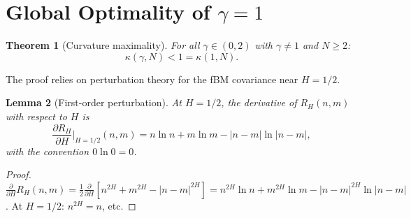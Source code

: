 \documentclass[11pt,a4paper]{article}
\theoremstyle{plain}
\newtheorem{theorem}{Theorem}[section]
\newtheorem{lemma}[theorem]{Lemma}
\theoremstyle{definition}
\theoremstyle{remark}
\begin{document}
\section{Global Optimality of $\gamma = 1$}\label{sec:optimality}

\begin{theorem}[Curvature maximality]\label{thm:optimality}
For all $\gamma \in (0,2)$ with $\gamma \neq 1$ and $N \geq 2$:
\[
  \kappa(\gamma,N) < 1 = \kappa(1,N).
\]
\end{theorem}

The proof relies on perturbation theory for the
fBM covariance near $H = 1/2$.

\begin{lemma}[First-order perturbation]\label{lem:perturbation}
At $H = 1/2$, the derivative of $R_H(n,m)$ with respect to
$H$ is
\begin{equation}\label{eq:dRdH}
  \frac{\partial R_H}{\partial H}\Big|_{H=1/2}(n,m)
  = n\ln n + m\ln m
  - |n-m|\ln|n-m|,
\end{equation}
with the convention $0 \ln 0 = 0$.
\end{lemma}

\begin{proof}
$\frac{\partial}{\partial H}R_H(n,m)
= \frac{1}{2}\frac{\partial}{\partial H}
[n^{2H} + m^{2H} - |n-m|^{2H}]
= n^{2H}\ln n + m^{2H}\ln m - |n-m|^{2H}\ln|n-m|$.
At $H = 1/2$: $n^{2H} = n$, etc.
\end{proof}
\end{document}
